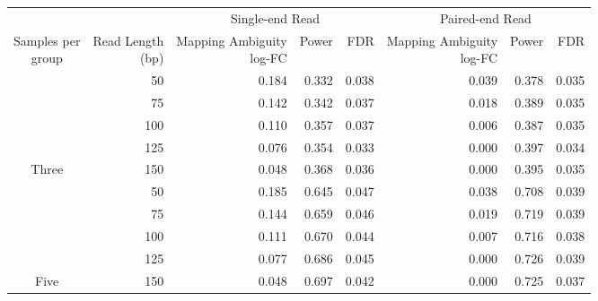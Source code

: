 
\begin{tabular}[t]{crrrrrrr}
\toprule
\multicolumn{2}{c}{ } & \multicolumn{3}{c}{Single-end Read} & \multicolumn{3}{c}{Paired-end Read} \\
\cmidrule(l{3pt}r{3pt}){3-5} \cmidrule(l{3pt}r{3pt}){6-8}
\makecell[c]{Samples per\\group} & \makecell[c]{Read Length\\(bp)} & \makecell[c]{Mapping Ambiguity\\log-FC} & Power & FDR & \makecell[c]{Mapping Ambiguity\\log-FC} & Power & FDR\\
\midrule
 & 50 & 0.184 & 0.332 & 0.038 & 0.039 & 0.378 & 0.035\\

 & 75 & 0.142 & 0.342 & 0.037 & 0.018 & 0.389 & 0.035\\

 & 100 & 0.110 & 0.357 & 0.037 & 0.006 & 0.387 & 0.035\\

 & 125 & 0.076 & 0.354 & 0.033 & 0.000 & 0.397 & 0.034\\

\multirow{-5}{*}{\centering\arraybackslash Three} & 150 & 0.048 & 0.368 & 0.036 & 0.000 & 0.395 & 0.035\\
\cmidrule{1-8}
 & 50 & 0.185 & 0.645 & 0.047 & 0.038 & 0.708 & 0.039\\

 & 75 & 0.144 & 0.659 & 0.046 & 0.019 & 0.719 & 0.039\\

 & 100 & 0.111 & 0.670 & 0.044 & 0.007 & 0.716 & 0.038\\

 & 125 & 0.077 & 0.686 & 0.045 & 0.000 & 0.726 & 0.039\\

\multirow{-5}{*}{\centering\arraybackslash Five} & 150 & 0.048 & 0.697 & 0.042 & 0.000 & 0.725 & 0.037\\
\bottomrule
\end{tabular}
